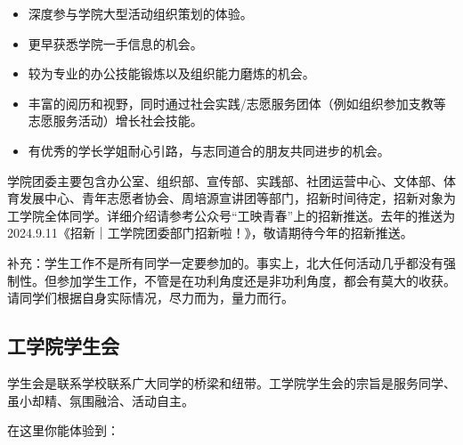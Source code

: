 \documentclass[11pt,oneside]{book}
\begin{document}
\begin{itemize}
    \item 深度参与学院大型活动组织策划的体验。
    
    \item 更早获悉学院一手信息的机会。
    
    \item 较为专业的办公技能锻炼以及组织能力磨炼的机会。
    
    \item 丰富的阅历和视野，同时通过社会实践/志愿服务团体（例如组织参加支教等志愿服务活动）增长社会技能。
    
    \item 有优秀的学长学姐耐心引路，与志同道合的朋友共同进步的机会。
\end{itemize}

\vspace{10pt}

学院团委主要包含办公室、组织部、宣传部、实践部、社团运营中心、文体部、体育发展中心、青年志愿者协会、周培源宣讲团等部门，招新时间待定，招新对象为工学院全体同学。详细介绍请参考公众号“工映青春”上的招新推送。去年的推送为2024.9.11《招新｜工学院团委部门招新啦！》，敬请期待今年的招新推送。

\vspace{10pt}

补充：学生工作不是所有同学一定要参加的。事实上，北大任何活动几乎都没有强制性。但参加学生工作，不管是在功利角度还是非功利角度，都会有莫大的收获。请同学们根据自身实际情况，尽力而为，量力而行。

\vspace{10pt}


\subsection{工学院学生会}

学生会是联系学校联系广大同学的桥梁和纽带。工学院学生会的宗旨是服务同学、虽小却精、氛围融洽、活动自主。

\vspace{10pt}

在这里你能体验到：
\end{document}
